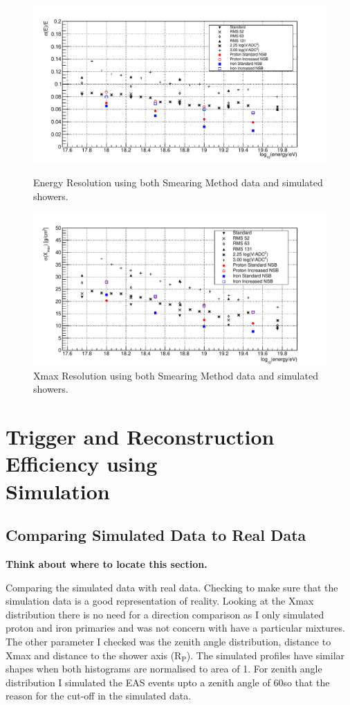 \begin{figure}
\centering
\includegraphics[width=\textwidth]{chapters/graphs/SelectionEff/Combined_EnergyRes_All.pdf}
\caption{Energy Resolution using both Smearing Method data and simulated showers.}
\vspace{3mm}
\includegraphics[width=\textwidth]{chapters/graphs/SelectionEff/Combined_XmaxRes_All.pdf}
\caption{Xmax Resolution using both Smearing Method data and simulated showers.}
\end{figure}

\section{Trigger and Reconstruction Efficiency using \\ Simulation}

\subsection{Comparing Simulated Data to Real Data}

\textbf{Think about where to locate this section.}

Comparing the simulated data with real data. Checking to make sure that the simulation data is a good representation of reality. Looking at the Xmax distribution there is no need for a direction comparison as I only simulated proton and iron primaries and was not concern with have a particular mixtures. The other parameter I checked was the zenith angle distribution, distance to Xmax and distance to the shower axis (R$_{\mathrm{P}}$). The simulated profiles have similar shapes when both histograms are normalised to area of 1. For zenith angle distribution I simulated the EAS events upto a zenith angle of 60\textdegree so that the reason for the cut-off in the simulated data.

